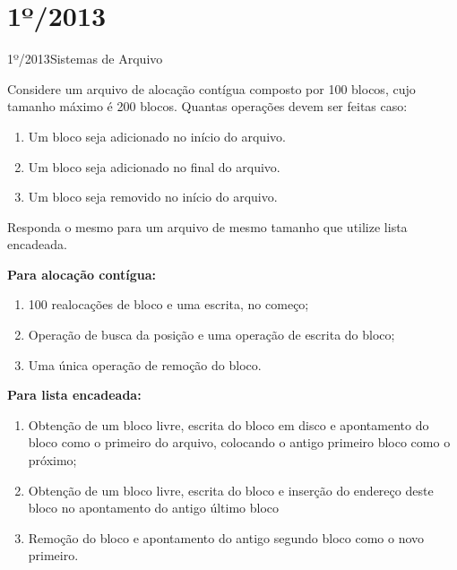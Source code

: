 \section{1º/2013}
\begin{exercicio}
  {1º/2013}{Sistemas de Arquivo}
  {Considere um arquivo de alocação contígua composto por 100 blocos, cujo tamanho máximo é 200 blocos. Quantas operações devem ser feitas caso:
  \begin{enumerate}
    \item Um bloco seja adicionado no início do arquivo.
    \item Um bloco seja adicionado no final do arquivo.
    \item Um bloco seja removido no início do arquivo.
  \end{enumerate}
  Responda o mesmo para um arquivo de mesmo tamanho que utilize lista encadeada.}

  \textbf{Para alocação contígua:}
  \begin{enumerate}
    \item 100 realocações de bloco e uma escrita, no começo;

    \item Operação de busca da posição e uma operação de escrita do bloco;

    \item Uma única operação de remoção do bloco.
  \end{enumerate}

  \textbf{Para lista encadeada:}
  \begin{enumerate}
    \item Obtenção de um bloco livre, escrita do bloco em disco e apontamento do bloco como o primeiro do arquivo, colocando o antigo primeiro bloco como o próximo;

    \item Obtenção de um bloco livre, escrita do bloco e inserção do endereço deste bloco no apontamento do antigo último bloco

    \item Remoção do bloco e apontamento do antigo segundo bloco como o novo primeiro.
  \end{enumerate}
\end{exercicio}

